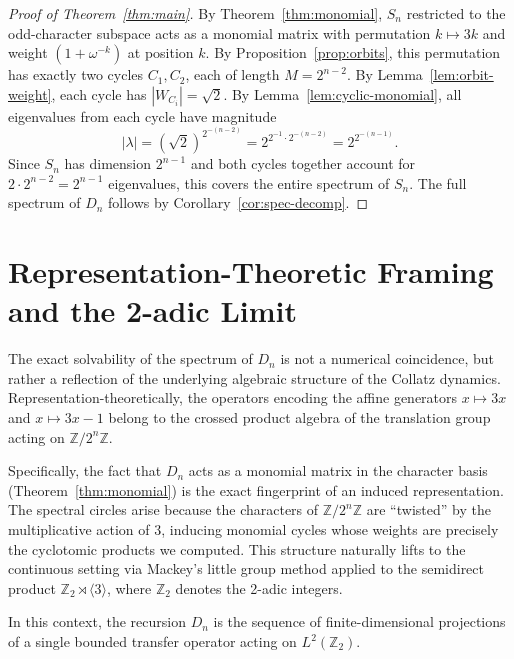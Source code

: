 \documentclass[11pt,reqno]{amsart}
\theoremstyle{definition}
\begin{document}
\begin{proof}[Proof of Theorem~\ref{thm:main}]
By Theorem~\ref{thm:monomial}, $S_n$ restricted to the odd-character subspace acts as a monomial matrix with permutation $k \mapsto 3k$ and weight $(1 + \omega^{-k})$ at position $k$. By Proposition~\ref{prop:orbits}, this permutation has exactly two cycles $C_1, C_2$, each of length $M = 2^{n-2}$. By Lemma~\ref{lem:orbit-weight}, each cycle has $|W_{C_i}| = \sqrt{2}$. By Lemma~\ref{lem:cyclic-monomial}, all eigenvalues from each cycle have magnitude
\[
|\lambda| = (\sqrt{2})^{2^{-(n-2)}} = 2^{2^{-1} \cdot 2^{-(n-2)}} = 2^{2^{-(n-1)}}.
\]
Since $S_n$ has dimension $2^{n-1}$ and both cycles together account for $2 \cdot 2^{n-2} = 2^{n-1}$ eigenvalues, this covers the entire spectrum of $S_n$. The full spectrum of $D_n$ follows by Corollary~\ref{cor:spec-decomp}.
\end{proof}

\section{Representation-Theoretic Framing and the 2-adic Limit}

The exact solvability of the spectrum of $D_n$ is not a numerical coincidence, but rather a reflection of the underlying algebraic structure of the Collatz dynamics. Representation-theoretically, the operators encoding the affine generators $x \mapsto 3x$ and $x \mapsto 3x-1$ belong to the crossed product algebra of the translation group acting on $\mathbb{Z}/2^n\mathbb{Z}$. 

Specifically, the fact that $D_n$ acts as a monomial matrix in the character basis (Theorem~\ref{thm:monomial}) is the exact fingerprint of an induced representation. The spectral circles arise because the characters of $\mathbb{Z}/2^n\mathbb{Z}$ are ``twisted'' by the multiplicative action of $3$, inducing monomial cycles whose weights are precisely the cyclotomic products we computed. This structure naturally lifts to the continuous setting via Mackey's little group method applied to the semidirect product $\mathbb{Z}_2 \rtimes \langle 3 \rangle$, where $\mathbb{Z}_2$ denotes the 2-adic integers.

In this context, the recursion $D_n$ is the sequence of finite-dimensional projections of a single bounded transfer operator acting on $L^2(\mathbb{Z}_2)$. 
\end{document}
